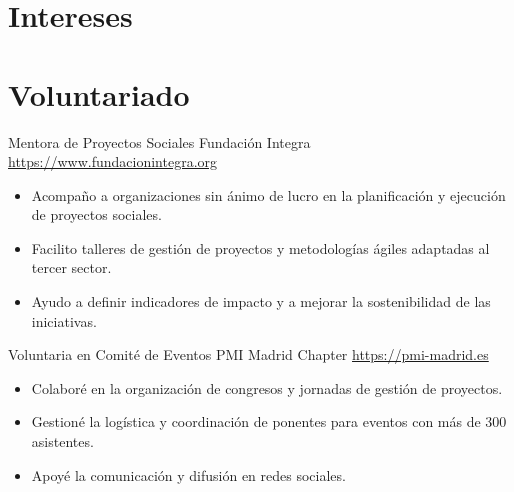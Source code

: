 \documentclass[a4paper, serif, 10pt]{moderncv}
\begin{document}
\section{Intereses}

\section{Voluntariado}

        {Mentora de Proyectos Sociales}
        {Fundación Integra}
        {\url{https://www.fundacionintegra.org}}
        {}
        {\begin{itemize}
\item Acompaño a organizaciones sin ánimo de lucro en la planificación y ejecución de proyectos sociales.
\item Facilito talleres de gestión de proyectos y metodologías ágiles adaptadas al tercer sector.
\item Ayudo a definir indicadores de impacto y a mejorar la sostenibilidad de las iniciativas.
\end{itemize}}
    

        {Voluntaria en Comité de Eventos}
        {PMI Madrid Chapter}
        {\url{https://pmi-madrid.es}}
        {}
        {\begin{itemize}
\item Colaboré en la organización de congresos y jornadas de gestión de proyectos.
\item Gestioné la logística y coordinación de ponentes para eventos con más de 300 asistentes.
\item Apoyé la comunicación y difusión en redes sociales.
\end{itemize}}
    
\end{document}
